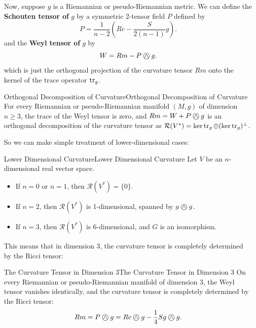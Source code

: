 \documentclass[../main.tex]{subfiles}
\begin{document}
Now, suppose $g$ is a Riemannian or pseudo-Riemannian metric. We can define the \textbf{Schouten tensor of} $g$ by a symmetric 2-tensor field $P$ defined by
\begin{equation}
	P = \frac{1}{n-2} \left( Rc - \frac{S}{2(n-1)} g \right).
\end{equation}
and the \textbf{Weyl tensor of} $g$ by
\begin{equation}
	W = Rm - P \owedge g.
\end{equation}
which is just the orthogonal projection of the curvature tensor $Rm$ onto the kernel of the trace operator $\operatorname{tr}_g$.

\begin{proposition}{Orthogonal Decomposition of Curvature}{Orthogonal Decomposition of Curvature}
	For every Riemannian or pseudo-Riemannian manifold $(M, g)$ of dimension $n \geq 3$, the trace of the Weyl tensor is zero, and $Rm = W + P \owedge g$ is an orthogonal decomposition of the curvature tensor as $\mathcal{R}(V^*) = \ker \operatorname{tr}_g \oplus (\ker \operatorname{tr}_g)^{\perp}$.
\end{proposition}

So we can make simple treatment of lower-dimensional cases:

\begin{corollary}{Lower Dimensional Curvature}{Lower Dimensional Curvature}
	Let $V$ be an $n$-dimensional real vector space.
	\begin{itemize}
		\item If $n=0$ or $n=1$, then $\mathcal{R}(V^*) = \{0\}$.
		\item If $n=2$, then $\mathcal{R}(V^*)$ is 1-dimensional, spanned by $g \owedge g$.
		\item If $n=3$, then $\mathcal{R}(V^*)$ is 6-dimensional, and $G$ is an isomorphism.
	\end{itemize}
\end{corollary}

This means that in dimension 3, the curvature tensor is completely determined by the Ricci tensor:

\begin{corollary}{The Curvature Tensor in Dimension 3}{The Curvature Tensor in Dimension 3}
	On every Riemannian or pseudo-Riemannian manifold of dimension 3, the Weyl tensor vanishes identically, and the curvature tensor is completely determined by the Ricci tensor:
	\begin{equation}
		Rm = P \owedge g = Rc \owedge g - \frac{1}{4} S g \owedge g.
	\end{equation}
\end{corollary}
\end{document}
